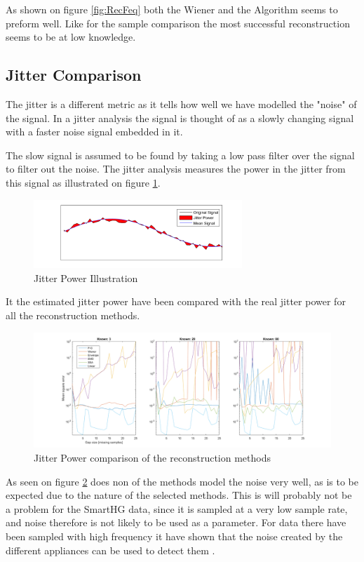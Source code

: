 As shown on figure \ref{fig:RecFeq} both the Wiener and the  Algorithm seems to preform well. Like for the sample comparison the most successful reconstruction seems to be at low knowledge. 

\subsection{Jitter Comparison }
\label{T:jitterCom}

The jitter is a different metric as it tells how well we have modelled the "noise" of the signal. In a jitter analysis the signal is thought of as a slowly changing signal with a faster noise signal embedded in it.

The slow signal is assumed to be found by taking a low pass filter over the signal to filter out the noise. The jitter analysis measures the power in the jitter from this signal as illustrated on figure \ref{fig:JitPow}. 

\begin{figure}[H]
\centering
\includegraphics[width=0.7\textwidth]{billeder/JitterPower.png}
\caption{Jitter Power Illustration}
\label{fig:JitPow}
\end{figure}

It the estimated jitter power have been compared with the real jitter power for all the reconstruction methods. 

\begin{figure}[H]
\centering
\includegraphics[width=1\textwidth]{billeder/RecJitter.png}
\caption{Jitter Power comparison of the reconstruction methods}
\label{fig:RecJit}
\end{figure}

As seen on figure \ref{fig:RecJit} does non of the methods model the noise very well, as is to be expected due to the nature of the selected methods. This is will probably not be a problem for the SmartHG data, since it is sampled at a very low sample rate, and noise therefore is not likely to be used as a parameter. For data there have been sampled with high frequency it have shown that the noise created by the different appliances can be used to detect them \citep{RefWorks:17}. 